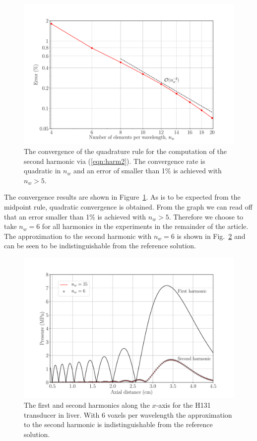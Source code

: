 \documentclass[preprint]{JASA}
\begin{document}
\begin{figure}[h!]
    \centering
    \includegraphics[width=\linewidth]{figures/conv_quad.pdf}
    \caption{The convergence of the quadrature rule for the computation of the 
    second harmonic via (\ref{eqn:harm2}). The convergence rate is quadratic
    in $n_w$ and an error of smaller than 1\% is achieved with $n_w>5$.}
    \label{fig:conv_quad}
\end{figure}
The convergence results are shown in Figure~\ref{fig:conv_quad}. As is to be 
expected from the midpoint rule, quadratic convergence is obtained. From the graph 
we can read off that an error smaller than 1\% is achieved with $n_w>5$. 
Therefore we choose to take $n_w=6$ for all harmonics in the experiments in the remainder of the 
article. The approximation to the second harmonic with $n_w=6$ is shown in
Fig.~\ref{fig:p2_quad} and can be seen to be indistinguishable from the
reference solution.
\begin{figure}[h!]
    \centering
    \includegraphics[width=\linewidth]{figures/p2_approx_compare.pdf}
    \caption{The first and second harmonics along the $x$-axis for the H131 
    transducer in liver. With 6 voxels per wavelength the approximation to the 
    second harmonic is indistinguishable from the reference solution.}
    \label{fig:p2_quad}
\end{figure}
\end{document}
